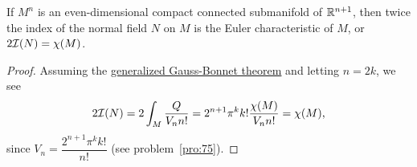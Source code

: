 \documentclass[../main]{subfiles}
\begin{document}
\begin{theorem} \label{thm:ch8.3.2}
    If $M^n$ is an even-dimensional compact connected submanifold of $\mathbb{R}^{n+1}$, then twice the index of the normal field $N$ on $M$ is the Euler characteristic of $M$, or $2\mathcal{I}(N)=\chi(M)$.
\end{theorem}

\begin{proof}
    Assuming the \hyperref[thm:ch8.3.1]{generalized Gauss-Bonnet theorem} and letting $n=2k$, we see
    \[ 2\mathcal{I}(N) = 2\int_M \frac{Q}{V_n n!} = 2^{n+1} \pi^k k! \frac{\chi(M)}{V_n n!} = \chi(M)\text{,} \]
    since $V_n = \dfrac{2^{n+1} \pi^k k!}{n!}$ (see problem~\ref{pro:75}).
\end{proof}
\end{document}
